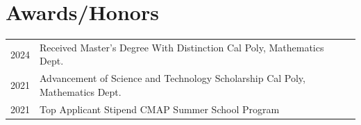\documentclass[a4paper,11pt]{article}
\begin{document}
\section{Awards/Honors}
\begin{tabularx}{\linewidth}{@{}l X@{}}
    2024 & Received Master's Degree With Distinction \hfill {Cal Poly, Mathematics Dept.} \\
    2021 & Advancement of Science and Technology Scholarship \hfill {Cal Poly, Mathematics Dept.} \\
    2021 & Top Applicant Stipend \hfill {CMAP Summer School Program} \\
\end{tabularx}


\vfill
{}
\end{document}
